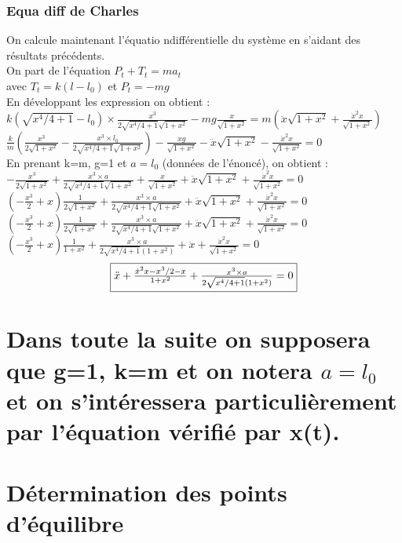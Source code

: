 \documentclass[10pt,a4paper]{article}
\begin{document}
\subsubsection{Equa diff de Charles}
On calcule maintenant l'équatio ndifférentielle du système en s'aidant des résultats précédents.\\
On part de l'équation $ P_t+T_t=ma_t $\\
avec $T_t=k(l-l_0)$ et $P_t=-mg$\\
En développant les expression on obtient :\\
$k(\sqrt{x^4/4+1}-l_0)\times \frac{x^3}{2\sqrt{x^4/4+1}\sqrt{1+x^2}}-mg\frac{x}{\sqrt{1+x^2}}=m(\ddot{x}\sqrt{1+x^2}+\frac{\ddot{x}^2x}{\sqrt{1+x^2}})$\\
$ \frac{k}{m}(\frac{x^3}{2\sqrt{1+x^2}}-\frac{x^3\times l_0}{2\sqrt{x^4/4+1}\sqrt{1+x^2}})-\frac{xg}{\sqrt{1+x^2}}-\ddot{x}\sqrt{1+x^2}-\frac{\dot{x}^2x}{\sqrt{1+x^2}}=0 $\\
En prenant k=m, g=1 et $a=l_0$ (données de l'énoncé), on obtient :\\
$ -\frac{x^3}{2\sqrt{1+x^2}}+\frac{x^3\times a}{2\sqrt{x^4/4+1}\sqrt{1+x^2}}+\frac{x}{\sqrt{1+x^2}}+\ddot{x}\sqrt{1+x^2}+\frac{\dot{x}^2x}{\sqrt{1+x^2}}=0 $\\
$ (-\frac{x^3}{2}+x)\frac{1}{2\sqrt{1+x^2}}+\frac{x^3\times a}{2\sqrt{x^4/4+1}\sqrt{1+x^2}}+\ddot{x}\sqrt{1+x^2}+\frac{\dot{x}^2x}{\sqrt{1+x^2}}=0 $\\
$ (-\frac{x^3}{2}+x)\frac{1}{2\sqrt{1+x^2}}+\frac{x^3\times a}{2\sqrt{x^4/4+1}\sqrt{1+x^2}}+\ddot{x}\sqrt{1+x^2}+\frac{\dot{x}^2x}{\sqrt{1+x^2}}=0 $\\
$ (-\frac{x^3}{2}+x)\frac{1}{1+x^2}+\frac{x^3\times a}{2\sqrt{x^4/4+1}(1+x^2)}+\ddot{x}+\frac{\dot{x}^2x}{\sqrt{1+x^2}}=0 $\\
\[ \fbox{$ \ddot{x}+\frac{\dot{x}^2x-x^3/2-x}{1+x^2}+\frac{x^3\times a}{2\sqrt{x^4/4+1}(1+x^2)}=0 $}\]

\section{Dans toute la suite on supposera que g=1, k=m et on notera $a=l_0$ et on s'intéressera particulièrement par l'équation vérifié par x(t).}
\section{Détermination des points d'équilibre}
\end{document}
